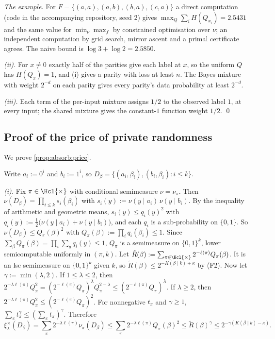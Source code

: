 \emph{The example.} For $F=\{(a,a),(a,b),(b,a),(c,a)\}$ a direct computation (code in the accompanying repository, seed 2) gives $\max_Q\sum_iH(Q_{x_i})=2.5431$ and the same value for $\min_\nu\max_f$ by constrained optimisation over $\nu$; an independent computation by grid search, mirror ascent and a primal certificate agrees. The naive bound is $\log3+\log2=2.5850$.

\emph{(ii).} For $x\ne0$ exactly half of the parities give each label at $x$, so the uniform $Q$ has $H(Q_x)=1$, and (i) gives a parity with loss at least $n$. The Bayes mixture with weight $2^{-d}$ on each parity gives every parity's data probability at least $2^{-d}$.

\emph{(iii).} Each term of the per-input mixture assigns $1/2$ to the observed label $1$, at every input; the shared mixture gives the constant-$1$ function weight $1/2$. \qed

\subsection{Proof of the price of private randomness}\label{app:absorb:price}

We prove \cref{prop:absorb:price}.

Write $a_i:=0^i$ and $b_i:=1^i$, so $D_\beta=\{(a_i,\beta_i),(b_i,\beta_i):i\le k\}$.

\emph{(i).} Fix $\pi\in\Hcl{\times}$ with conditional semimeasure $\nu=\nu_\pi$. Then $\nu(D_\beta)=\prod_{i\le k}s_i(\beta_i)$ with $s_i(y):=\nu(y\mid a_i)\,\nu(y\mid b_i)$. By the inequality of arithmetic and geometric means, $s_i(y)\le q_i(y)^2$ with $q_i(y):=\frac12\big(\nu(y\mid a_i)+\nu(y\mid b_i)\big)$, and each $q_i$ is a sub-probability on $\{0,1\}$. So $\nu(D_\beta)\le Q_\pi(\beta)^2$ with $Q_\pi(\beta):=\prod_iq_i(\beta_i)\le1$. Since $\sum_\beta Q_\pi(\beta)=\prod_i\sum_yq_i(y)\le1$, $Q_\pi$ is a semimeasure on $\{0,1\}^k$, lower semicomputable uniformly in $(\pi,k)$. Let $\tilde R(\beta):=\sum_{\pi\in\Hcl{\times}}2^{-\ell(\pi)}Q_\pi(\beta)$. It is an lsc semimeasure on $\{0,1\}^k$ given $k$, so $\tilde R(\beta)\le2^{-K(\beta\mid k)+\kappa}$ by (F2). Now let $\gamma:=\min(\lambda,2)$. If $1\le\lambda\le2$, then $2^{-\lambda\ell(\pi)}Q_\pi^2=(2^{-\ell(\pi)}Q_\pi)^\lambda Q_\pi^{2-\lambda}\le(2^{-\ell(\pi)}Q_\pi)^\lambda$. If $\lambda\ge2$, then $2^{-\lambda\ell(\pi)}Q_\pi^2\le(2^{-\ell(\pi)}Q_\pi)^2$. For nonnegative $t_\pi$ and $\gamma\ge1$, $\sum_\pi t_\pi^\gamma\le(\sum_\pi t_\pi)^\gamma$. Therefore
\[
\xi^\times_\lambda(D_\beta)=\sum_\pi2^{-\lambda\ell(\pi)}\nu_\pi(D_\beta)\le\sum_\pi2^{-\lambda\ell(\pi)}Q_\pi(\beta)^2\le\tilde R(\beta)^{\gamma}\le2^{-\gamma(K(\beta\mid k)-\kappa)}.
\]

